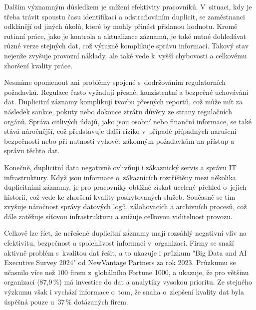 Dalším významným důsledkem je snížení efektivity pracovníků. V~situaci, kdy je třeba trávit spoustu času identifikací a odstraňováním duplicit, se zaměstnanci odklánějí od jiných úkolů, které by mohly přinést přidanou hodnotu. Kromě rutinní práce, jako je kontrola a aktualizace záznamů, je také nutné dohledávat různé verze stejných dat, což výrazně komplikuje správu informací. Takový stav nejenže zvyšuje provozní náklady, ale také vede k~vyšší chybovosti a celkovému zhoršení kvality práce.

Nesmíme opomenout ani problémy spojené s~dodržováním regulatorních požadavků. Regulace často vyžadují přesné, konzistentní a bezpečné uchovávání dat. Duplicitní záznamy komplikují tvorbu přesných reportů, což může mít za následek sankce, pokuty nebo dokonce ztrátu důvěry ze strany regulačních orgánů. Správa citlivých údajů, jako jsou osobní nebo finanční informace, se také stává náročnější, což představuje další riziko v~případě případných narušení bezpečnosti nebo při nutnosti vyhovět zákonným požadavkům na přístup a správu těchto dat.

Konečně, duplicitní data negativně ovlivňují i zákaznický servis a správu IT infrastruktury. Když jsou informace o~zákaznících roztříštěny mezi několika duplicitními záznamy, je pro pracovníky obtížné získat ucelený přehled o~jejich historii, což vede ke zhoršení kvality poskytovaných služeb. Současně se tím zvyšuje náročnost správy datových logů, zálohovacích a archivních procesů, což dále zatěžuje síťovou infrastrukturu a snižuje celkovou viditelnost provozu.

Celkově lze říct, že neřešené duplicitní záznamy mají rozsáhlý negativní vliv na efektivitu, bezpečnost a spolehlivost informací v~organizaci. Firmy se snaží aktivně problém s~kvalitou dat řešit, a to ukazuje i průzkum "Big Data and AI Executive Survey 2024" od NewVantage Partners za rok 2023. Průzkumu se učasnilo více než 100 firem z~globálního Fortune 1000, a ukazuje, že pro většinu organizací (87,9\,\%) má investice do dat a analytiky vysokou prioritu. Ze stejného výzkumu však i vychází informace o~tom, že snaha o~zlepšení kvality dat byla úspěšná pouze u~37\,\% dotázaných firem.

